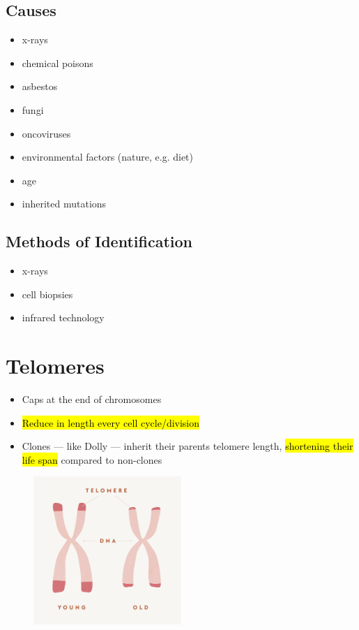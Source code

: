 \documentclass[a4paper,12pt]{article}
\begin{document}
\subsection{Causes}
\begin{itemize}
    \item{x-rays}
    \item{chemical poisons}
    \item{asbestos}
    \item{fungi}
    \item{oncoviruses}
    \item{environmental factors (nature, e.g. diet)}
    \item{age}
    \item{inherited mutations}
\end{itemize}

\subsection{Methods of Identification}
\begin{itemize}
    \item{x-rays}
    \item{cell biopsies}
    \item{infrared technology}
\end{itemize}

\section{Telomeres}
\begin{itemize}
    \item{Caps at the end of chromosomes}
    \item{\hl{Reduce in length every cell cycle/division}}
    \item{Clones --- like Dolly --- inherit their parents telomere length, \hl{shortening their life span} compared to non-clones} 
\end{itemize}

\begin{figure}[H]
    \centering
    \includegraphics[width=0.50\textwidth]{telomere}
\end{figure}
\end{document}
